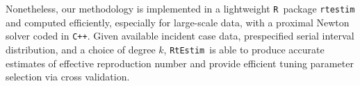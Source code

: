 \documentclass[10pt,letterpaper]{article}
\newcommand{\R}{\texttt{R}}
\newcommand{\cpp}{\texttt{C++}}
\def\RtEstim{\texttt{RtEstim}}
\def\calR{\mathcal{R}}
\begin{document}
Nonetheless, our methodology is implemented in a lightweight \R\ package 
\texttt{rtestim} and computed efficiently, especially for large-scale data, 
with a proximal Newton solver coded in \cpp. 
Given available incident case data, prespecified serial interval
distribution, and a choice of degree $k$, \RtEstim\ is able to produce
accurate estimates of effective reproduction number and provide efficient
tuning parameter selection via cross validation. 


%
%
%
%
\end{document}
